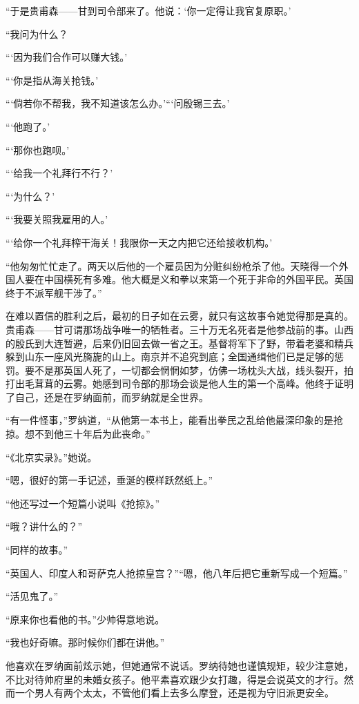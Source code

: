 \par “于是贵甫森——甘到司令部来了。他说：‘你一定得让我官复原职。’
\par “我问为什么？
\par “‘因为我们合作可以赚大钱。’
\par “‘你是指从海关抢钱。’
\par “‘倘若你不帮我，我不知道该怎么办。’“‘问殷锡三去。’
\par “‘他跑了。’
\par “‘那你也跑呗。’
\par “‘给我一个礼拜行不行？’
\par “‘为什么？’
\par “‘我要关照我雇用的人。’
\par “‘给你一个礼拜榨干海关！我限你一天之内把它还给接收机构。’
\par “他匆匆忙忙走了。两天以后他的一个雇员因为分赃纠纷枪杀了他。天晓得一个外国人要在中国横死有多难。他大概是义和拳以来第一个死于非命的外国平民。英国终于不派军舰干涉了。”
\par 在难以置信的胜利之后，最初的日子如在云雾，就只有这故事令她觉得那是真的。贵甫森——甘可谓那场战争唯一的牺牲者。三十万无名死者是他参战前的事。山西的殷氏到大连暂避，后来仍旧回去做一省之王。基督将军下了野，带着老婆和精兵躲到山东一座风光旖旎的山上。南京并不追究到底；全国通缉他们已是足够的惩罚。要不是那英国人死了，一切都会惘惘如梦，仿佛一场枕头大战，线头裂开，拍打出毛茸茸的云雾。她感到司令部的那场会谈是他人生的第一个高峰。他终于证明了自己，还是在罗纳面前，而罗纳就是全世界。
\par “有一件怪事，”罗纳道，“从他第一本书上，能看出拳民之乱给他最深印象的是抢掠。想不到他三十年后为此丧命。”
\par “《北京实录》。”她说。
\par “嗯，很好的第一手记述，垂涎的模样跃然纸上。”
\par “他还写过一个短篇小说叫《抢掠》。”
\par “哦？讲什么的？”
\par “同样的故事。”
\par “英国人、印度人和哥萨克人抢掠皇宫？”“嗯，他八年后把它重新写成一个短篇。”
\par “活见鬼了。”
\par “原来你也看他的书。”少帅得意地说。
\par “我也好奇嘛。那时候你们都在讲他。”
\par 他喜欢在罗纳面前炫示她，但她通常不说话。罗纳待她也谨慎规矩，较少注意她，不比对待帅府里的未婚女孩子。他平素喜欢跟少女打趣，得是会说英文的才行。然而一个男人有两个太太，不管他们看上去多么摩登，还是视为守旧派更安全。
